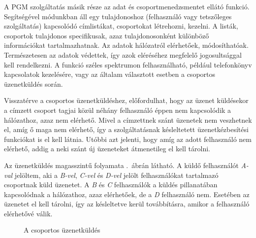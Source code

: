 A PGM szolgáltatás másik része az adat és csoportmenedzsmentet ellátó funkció. Segítségével módunkban áll egy tulajdonoshoz (felhasználó vagy tetszőleges szolgáltatás) kapcsolódó címlistákat, csoportokat létrehozni, kezelni. A listák, csoportok tulajdonos specifikusak, azaz tulajdonosonként különböző információkat tartalmazhatnak. Az adatok hálózatról elérhetőek, módosíthatóak. Természetesen az adatok védettek, így azok eléréséhez megfelelő jogosultsággal kell rendelkezni. A funkció széles spektrumon felhasználható, például telefonkönyv kapcsolatok kezelésére, vagy az általam választott esetben a csoportos üzenetküldés során. 

Visszatérve a csoportos üzenetküldéshez, előfordulhat, hogy az üzenet küldésekor a címzett csoport tagjai közül néhány felhasználó éppen nem kapcsolódik a hálózathoz, azaz nem elérhető. Mivel a címzettnek szánt üzenetek nem veszhetnek el, amíg ő maga nem elérhető, így a szolgáltatásnak késleltetett üzenetkézbesítési funkciókat is el kell látnia. Utóbbi azt jelenti, hogy amíg az adott felhasználó nem elérhető, addig a neki szánt új üzeneteket átmenetileg el kell tárolni.

Az üzenetküldés magasszintű folyamata .~ábrán látható. A küldő felhasználót \emph{A-val} jelöltem, aki a \emph{B-vel}, \emph{C-vel} és \emph{D-vel} jelölt felhasználókat tartalmazó csoportnak küld üzenetet. A \emph{B} és \emph{C} felhasználók a küldés pillanatában kapcsolódnak a hálózathoz, azaz elérhetőek, de a \emph{D} felhasználó nem. Esetében az üzenetet el kell tárolni, így az késleltetve kerül továbbításra, amikor a felhasználó elérhetővé válik.

\begin{figure}[htbp]
\center
{}
\caption{A csoportos üzenetküldés}
\label{fig:group_messaging}
\end{figure}

